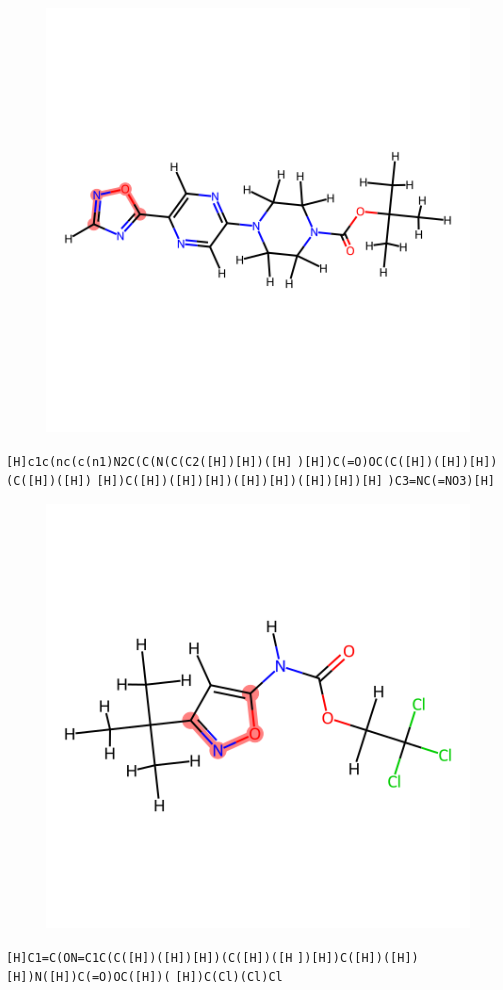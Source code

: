 \documentclass{article}
\begin{document}
\begin{figure}[ht]
\centering
    \includegraphics{mol38.png}
\end{figure}
\verb|[H]c1c(nc(c(n1)N2C(C(N(C(C2([H])[H])([H]| \verb|)[H])C(=O)OC(C([H])([H])[H])(C([H])([H])| \verb|[H])C([H])([H])[H])([H])[H])([H])[H])[H]| \verb|)C3=NC(=NO3)[H]|

\begin{figure}[ht]
\centering
    \includegraphics{mol39.png}
\end{figure}
\verb|[H]C1=C(ON=C1C(C([H])([H])[H])(C([H])([H| \verb|])[H])C([H])([H])[H])N([H])C(=O)OC([H])(| \verb|[H])C(Cl)(Cl)Cl|
\end{document}
